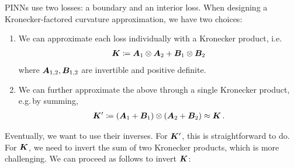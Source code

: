 PINNs use two losses: a boundary and an interior loss.
When designing a Kronecker-factored curvature approximation, we have two choices:
\begin{enumerate}
\item We can approximate each loss individually with a Kronecker product, i.e.
  \begin{align*}
    {\bm{K}} \coloneqq {\bm{A}}_1 \otimes {\bm{A}}_2 + {\bm{B}}_1 \otimes {\bm{B}}_2
  \end{align*}
  where ${\bm{A}}_{1,2}, {\bm{B}}_{1,2}$ are invertible and positive definite.

\item We can further approximate the above through a single Kronecker product, e.g.\,by summing,
  \begin{align*}
    {\bm{K}}' \coloneqq ({\bm{A}}_1 + {\bm{B}}_1) \otimes ({\bm{A}}_2 + {\bm{B}}_2) \approx {\bm{K}}\,.
  \end{align*}
\end{enumerate}
Eventually, we want to use their inverses.
For ${\bm{K}}'$, this is straightforward to do.
For ${\bm{K}}$, we need to invert the sum of two Kronecker products, which is more challenging.
We can proceed as follows to invert ${\bm{K}}$:
